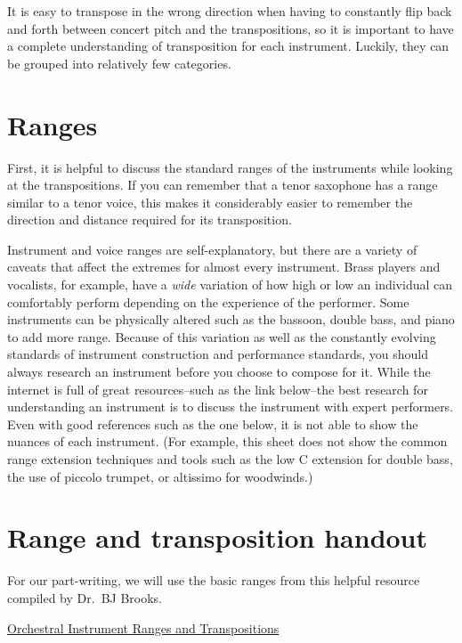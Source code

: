 \documentclass{book}
\begin{document}
It is easy to transpose in the wrong direction when having to constantly flip
back and forth between concert pitch and the transpositions, so it is
important to have a complete understanding of transposition for each
instrument. Luckily, they can be grouped into relatively few categories.

\hypertarget{ranges}{%
\chapter{Ranges}\label{ranges}}

First, it is helpful to discuss the standard ranges of the instruments while
looking at the transpositions. If you can remember that a tenor saxophone has
a range similar to a tenor voice, this makes it considerably easier to
remember the direction and distance required for its transposition.

Instrument and voice ranges are self-explanatory, but there are a variety of
caveats that affect the extremes for almost every instrument. Brass players
and vocalists, for example, have a \emph{wide} variation of how high or low an
individual can comfortably perform depending on the experience of the
performer. Some instruments can be physically altered such as the bassoon,
double bass, and piano to add more range. Because of this variation as well as
the constantly evolving standards of instrument construction and performance
standards, you should always research an instrument before you choose to
compose for it. While the internet is full of great resources--such as the
link below--the best research for understanding an instrument is to discuss
the instrument with expert performers. Even with good references such as the
one below, it is not able to show the nuances of each instrument. (For
example, this sheet does not show the common range extension techniques and
tools such as the low C extension for double bass, the use of piccolo trumpet,
or altissimo for woodwinds.)

\hypertarget{range-and-transposition-handout}{%
\chapter{Range and transposition
handout}\label{range-and-transposition-handout}}

For our part-writing, we will use the basic ranges from this helpful resource
compiled by Dr.~BJ Brooks.

\href{http://octatone.com/orchestral-ranges-transposition/}{Orchestral
Instrument Ranges and Transpositions}
\end{document}

